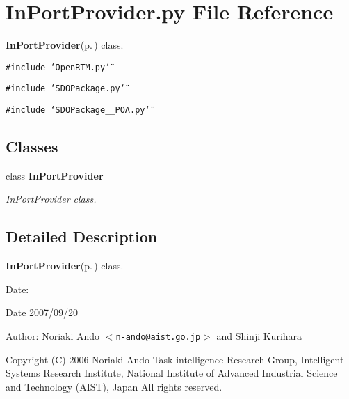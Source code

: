 \section{In\-Port\-Provider.py File Reference}
\label{InPortProvider_8py}
{\bf In\-Port\-Provider}{\rm (p.\,\pageref{classInPortProvider})} class. 

{\tt \#include \char`\"{}Open\-RTM.py\char`\"{}}\par
{\tt \#include \char`\"{}SDOPackage.py\char`\"{}}\par
{\tt \#include \char`\"{}SDOPackage\_\-\_\-POA.py\char`\"{}}\par
\subsection*{Classes}
\begin{CompactItemize}
\item 
class {\bf In\-Port\-Provider}
\begin{CompactList}\small\item\em In\-Port\-Provider class. \item\end{CompactList}\end{CompactItemize}


\subsection{Detailed Description}
{\bf In\-Port\-Provider}{\rm (p.\,\pageref{classInPortProvider})} class. 

\begin{Desc}
\item[Date:]\begin{Desc}
\item[Date]2007/09/20 \end{Desc}
\end{Desc}
\begin{Desc}
\item[Author:]Noriaki Ando $<${\tt n-ando@aist.go.jp}$>$ and Shinji Kurihara\end{Desc}
Copyright (C) 2006 Noriaki Ando Task-intelligence Research Group, Intelligent Systems Research Institute, National Institute of Advanced Industrial Science and Technology (AIST), Japan All rights reserved.